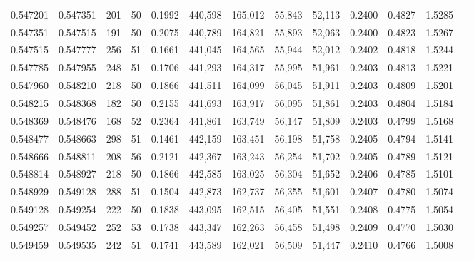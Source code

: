 \begin{tabular}{rrrrrrrrrrrrr}
0.547201 & 0.547351 &   201 &  50 &                                     0.1992 & 440,598 & 165,012 &  55,843 &  52,113 & 0.2400 & 0.4827 & 1.5285 \\
0.547351 & 0.547515 &   191 &  50 &                                     0.2075 & 440,789 & 164,821 &  55,893 &  52,063 & 0.2400 & 0.4823 & 1.5267 \\
0.547515 & 0.547777 &   256 &  51 &                                     0.1661 & 441,045 & 164,565 &  55,944 &  52,012 & 0.2402 & 0.4818 & 1.5244 \\
0.547785 & 0.547955 &   248 &  51 &                                     0.1706 & 441,293 & 164,317 &  55,995 &  51,961 & 0.2403 & 0.4813 & 1.5221 \\
0.547960 & 0.548210 &   218 &  50 &                                     0.1866 & 441,511 & 164,099 &  56,045 &  51,911 & 0.2403 & 0.4809 & 1.5201 \\
0.548215 & 0.548368 &   182 &  50 &                                     0.2155 & 441,693 & 163,917 &  56,095 &  51,861 & 0.2403 & 0.4804 & 1.5184 \\
0.548369 & 0.548476 &   168 &  52 &                                     0.2364 & 441,861 & 163,749 &  56,147 &  51,809 & 0.2403 & 0.4799 & 1.5168 \\
0.548477 & 0.548663 &   298 &  51 &                                     0.1461 & 442,159 & 163,451 &  56,198 &  51,758 & 0.2405 & 0.4794 & 1.5141 \\
0.548666 & 0.548811 &   208 &  56 &                                     0.2121 & 442,367 & 163,243 &  56,254 &  51,702 & 0.2405 & 0.4789 & 1.5121 \\
0.548814 & 0.548927 &   218 &  50 &                                     0.1866 & 442,585 & 163,025 &  56,304 &  51,652 & 0.2406 & 0.4785 & 1.5101 \\
0.548929 & 0.549128 &   288 &  51 &                                     0.1504 & 442,873 & 162,737 &  56,355 &  51,601 & 0.2407 & 0.4780 & 1.5074 \\
0.549128 & 0.549254 &   222 &  50 &                                     0.1838 & 443,095 & 162,515 &  56,405 &  51,551 & 0.2408 & 0.4775 & 1.5054 \\
0.549257 & 0.549452 &   252 &  53 &                                     0.1738 & 443,347 & 162,263 &  56,458 &  51,498 & 0.2409 & 0.4770 & 1.5030 \\
0.549459 & 0.549535 &   242 &  51 &                                     0.1741 & 443,589 & 162,021 &  56,509 &  51,447 & 0.2410 & 0.4766 & 1.5008 \\

\end{tabular}
